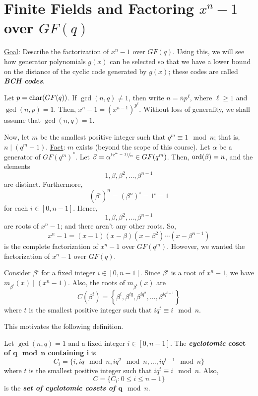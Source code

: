 \section{Finite Fields and Factoring \texorpdfstring{$ x^n-1 $}{xⁿ-1}
  over \texorpdfstring{$ GF(q) $}{GF(q)}}
\underline{Goal}: Describe the factorization of
$ x^n-1 $ over $ GF(q) $. Using this, we will see how
generator polynomials $ g(x) $ can be selected so that we have a
lower bound on the distance of the cyclic code
generated by $ g(x) $; these codes are called \textbf{\emph{BCH codes}}.

Let $ p=\operatorname{char}(GF(q)) $. If $ \gcd(n,q)\neq 1 $, then
write $ n=\overline{n}p^\ell $, where $ \ell\geqslant 1 $
and $ \gcd(\overline{n},p)=1 $. Then, $ x^n-1=(x^{\overline{n}-1})^{p^\ell} $.
Without loss of generality, we shall assume that $ \gcd(n,q)=1 $.

Now, let $ m $ be the smallest positive integer such that
$ q^m\equiv 1\mod n $; that is, $ n\mid (q^m-1) $.
\underline{Fact}: $ m $ exists (beyond the scope of this course).
Let $ \alpha $ be a generator of $ GF(q^m)^* $.
Let $ \beta=\alpha^{\sfrac{(q^m-1)}{n}} \in GF(q^m) $.
Then, $ \operatorname{ord}(\beta)=n $, and the elements
\[ 1,\beta,\beta^2,\ldots ,\beta^{n-1} \]
are distinct. Furthermore,
\[ (\beta^i)^n=(\beta^n)^i=1^i=1 \]
for each $ i\in[0,n-1] $. Hence,
\[ 1,\beta,\beta^2,\ldots ,\beta^{n-1} \]
are roots of $ x^n-1 $; and there aren't any other roots. So,
\[ x^n-1=(x-1)(x-\beta)(x-\beta^2)\cdots(x-\beta^{n-1}) \]
is the complete factorization of $ x^n-1 $ over $ GF(q^m) $.
However, we wanted the factorization of $ x^n-1 $ over $ GF(q) $.

Consider $ \beta^i $ for a fixed integer $ i\in[0,n-1] $. Since
$ \beta^i $ is a root of $ x^n-1 $, we have $ m_{\beta^i}(x)\mid (x^n-1) $.
Also, the roots of $ m_{\beta^i}(x) $ are
\[ C(\beta^i)=\left\{ \beta^i,\beta^{iq},\beta^{iq^2},\ldots ,\beta^{iq^{t-1}}\right\} \]
where $ t $ is the smallest positive integer such that $ iq^t\equiv i\mod n $.

This motivates the following definition.
\begin{defbox}
    \begin{definition}
        Let $ \gcd(n,q)=1 $ and a fixed integer $ i\in[0,n-1] $. The
        \textbf{\emph{cyclotomic} coset of $\bm{q\mod n}$
            containing $\bm{i}$} is
        \[ C_i=\{i,iq\mod n,iq^2\mod n,\ldots ,iq^{t-1}\mod n\} \]
        where $ t $ is the smallest positive integer such that $ iq^t\equiv i\mod n $.
        Also,
        \[ C=\{C_i:0\leqslant i\leqslant n-1\} \]
        is the \textbf{\emph{set of cyclotomic cosets of $\bm{q}\mod n$}}.
    \end{definition}
\end{defbox}

